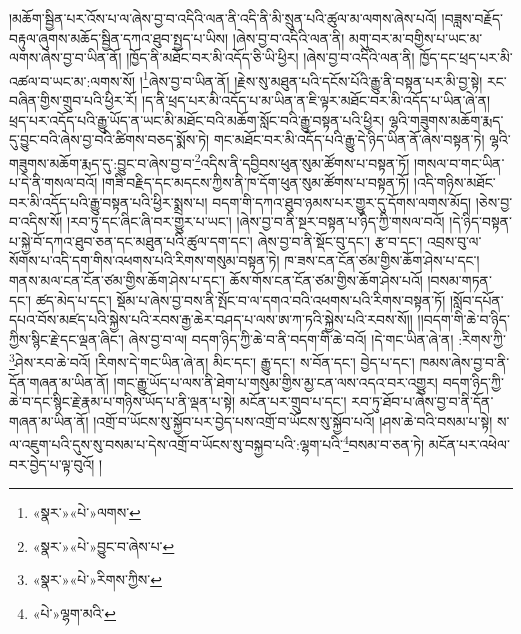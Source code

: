 །མཆོག་སྦྱིན་པར་འོས་པ་ལ་ཞེས་བྱ་བ་འདིའི་ལན་ནི་འདི་ནི་མི་སྲུན་པའི་ཚུལ་མ་ལགས་ཞེས་པའོ། །བཟླས་བརྗོད་བརྟུལ་ཞུགས་མཆོད་སྦྱིན་དཀའ་ཐུབ་སྤྱད་པ་ཡིས། །ཞེས་བྱ་བ་འདིའི་ལན་ནི། མགུ་བར་མ་བགྱིས་པ་ཡང་མ་ལགས་ཞེས་བྱ་བ་ཡིན་ནོ། །ཁྱོད་ནི་མཐོང་བར་མི་འདོད་ཅི་ཡི་ཕྱིར། །ཞེས་བྱ་བ་འདིའི་ལན་ནི། ཁྱོད་དང་ཕྲད་པར་མི་འཚལ་བ་ཡང་མ་:ལགས་སོ། །\footnote{«སྣར་»«པེ་»ལགས་}ཞེས་བྱ་བ་ཡིན་ནོ། །རྗེས་སུ་མཐུན་པའི་དངོས་པོའི་རྒྱུ་ནི་བསྟན་པར་མི་བྱ་སྟེ། རང་བཞིན་གྱིས་གྲུབ་པའི་ཕྱིར་རོ། །ད་ནི་ཕྲད་པར་མི་འདོད་པ་མ་ཡིན་ན་ཇི་ལྟར་མཐོང་བར་མི་འདོད་པ་ཡིན་ཞེ་ན། ཕྲད་པར་འདོད་པའི་རྒྱུ་ཡོད་ན་ཡང་མི་མཐོང་བའི་མཆོག་སློང་བའི་རྒྱུ་བསྟན་པའི་ཕྱིར། ལྷའི་གཟུགས་མཆོག་རྨད་དུ་བྱུང་བའི་ཞེས་བྱ་བའི་ཚིགས་བཅད་སྨོས་ཏེ། གང་མཐོང་བར་མི་འདོད་པའི་རྒྱུ་དེ་ཉིད་ཡིན་ནོ་ཞེས་བསྟན་ཏེ། ལྷའི་གཟུགས་མཆོག་རྨད་དུ་:བྱུང་བ་ཞེས་བྱ་བ་\footnote{«སྣར་»«པེ་»བྱུང་བ་ཞེས་པ་}འདིས་ནི་དབྱིབས་ཕུན་སུམ་ཚོགས་པ་བསྟན་ཏོ། །གསལ་བ་གང་ཡིན་པ་དེ་ནི་གསལ་བའོ། །གཟི་བརྗིད་དང་མདངས་ཀྱིས་ནི་ཁ་དོག་ཕུན་སུམ་ཚོགས་པ་བསྟན་ཏོ། །འདི་གཉིས་མཐོང་བར་མི་འདོད་པའི་རྒྱུ་བསྟན་པའི་ཕྱིར་སྨྲས་པ། བདག་གི་དཀའ་ཐུབ་ཉམས་པར་གྱུར་དུ་དོགས་ལགས་མོད། །ཅེས་བྱ་བ་འདིས་སོ། །རབ་ཏུ་དང་ཞིང་ཞི་བར་གྱུར་པ་ཡང་། །ཞེས་བྱ་བ་ནི་སྔར་བསྟན་པ་ཉིད་ཀྱི་གསལ་བའོ། །དེ་ཉིད་བསྟན་པ་སྐྱེ་བོ་དཀའ་ཐུབ་ཅན་དང་མཐུན་པའི་ཚུལ་དག་དང་། ཞེས་བྱ་བ་ནི་སྡོང་བུ་དང་། རྩ་བ་དང་། འབྲས་བུ་ལ་སོགས་པ་འདི་དག་གིས་འཕགས་པའི་རིགས་གསུམ་བསྟན་ཏེ། ཁ་ཟས་ངན་ངོན་ཙམ་གྱིས་ཆོག་ཤེས་པ་དང་། གནས་མལ་ངན་ངོན་ཙམ་གྱིས་ཆོག་ཤེས་པ་དང་། ཆོས་གོས་ངན་ངོན་ཙམ་གྱིས་ཆོག་ཤེས་པའོ། །བསམ་གཏན་དང་། ཚད་མེད་པ་དང་། སྡོམ་པ་ཞེས་བྱ་བས་ནི་སྤོང་བ་ལ་དགའ་བའི་འཕགས་པའི་རིགས་བསྟན་ཏོ། །སློབ་དཔོན་དཔའ་བོས་མཛད་པའི་སྐྱེས་པའི་རབས་རྒྱ་ཆེར་བཤད་པ་ལས་ཨ་ཀ་ཏའི་སྐྱེས་པའི་རབས་སོ།། །།བདག་གི་ཆེ་བ་ཉིད་ཀྱིས་སྙིང་རྗེ་དང་ལྡན་ཞིང་། ཞེས་བྱ་བ་ལ། བདག་ཉིད་ཀྱི་ཆེ་བ་ནི་བདག་གི་ཆེ་བའོ། །དེ་གང་ཡིན་ཞེ་ན། :རིགས་ཀྱི་\footnote{«སྣར་»«པེ་»རིགས་ཀྱིས་}ཤེས་རབ་ཆེ་བའོ། །རིགས་དེ་གང་ཡིན་ཞེ་ན། མིང་དང་། རྒྱུ་དང་། ས་བོན་དང་། བྱེད་པ་དང་། ཁམས་ཞེས་བྱ་བ་ནི་དོན་གཞན་མ་ཡིན་ནོ། །གང་རྒྱུ་ཡོད་པ་ལས་ནི་ཐེག་པ་གསུམ་གྱིས་མྱ་ངན་ལས་འདའ་བར་འགྱུར། བདག་ཉིད་ཀྱི་ཆེ་བ་དང་སྙིང་རྗེ་རྣམ་པ་གཉིས་ཡོད་པ་ནི་ལྡན་པ་སྟེ། མངོན་པར་གྲུབ་པ་དང་། རབ་ཏུ་ཐོབ་པ་ཞེས་བྱ་བ་ནི་དོན་གཞན་མ་ཡིན་ནོ། །འགྲོ་བ་ཡོངས་སུ་སྐྱོབ་པར་བྱེད་པས་འགྲོ་བ་ཡོངས་སུ་སྐྱོབ་པའོ། །ཤས་ཆེ་བའི་བསམ་པ་སྟེ། ས་ལ་འཇུག་པའི་དུས་སུ་བསམ་པ་དེས་འགྲོ་བ་ཡོངས་སུ་བསྐྱབ་པའི་:ལྷག་པའི་\footnote{«པེ་»ལྷག་མའི་}བསམ་བ་ཅན་ཏེ། མངོན་པར་འཕེལ་བར་བྱེད་པ་ལྟ་བུའོ། །
